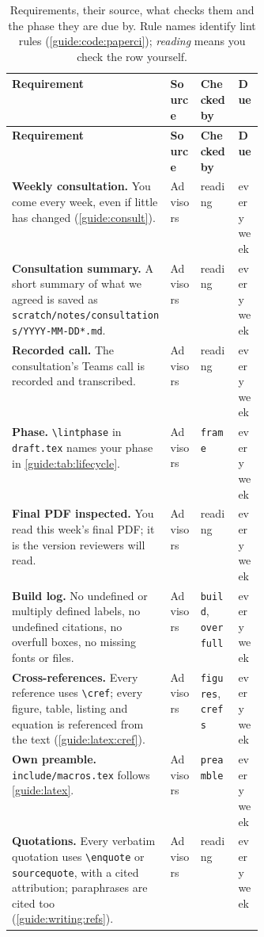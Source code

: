 {\small
\begin{xltabular}{\linewidth}{X >{\raggedright\arraybackslash}p{0.12\linewidth} >{\raggedright\arraybackslash}p{0.15\linewidth} >{\raggedright\arraybackslash}p{0.1\linewidth}}
  \caption{Requirements, their source, what checks them and the phase they are due by. Rule names identify lint rules (\cref{guide:code:paperci}); \emph{reading} means you check the row yourself.}\label{guide:tab:polish}\\
  \toprule \textbf{Requirement} & \textbf{Source} & \textbf{Checked by} & \textbf{Due} \\ \midrule \endfirsthead
  \toprule \textbf{Requirement} & \textbf{Source} & \textbf{Checked by} & \textbf{Due} \\ \midrule \endhead
  \bottomrule \endlastfoot
  \textbf{Weekly consultation.} You come every week, even if little has changed (\cref{guide:consult}). & Advisors & reading & every week \\
  \textbf{Consultation summary.} A short summary of what we agreed is saved as \texttt{scratch/notes/consultations/YYYY-MM-DD*.md}. & Advisors & reading & every week \\
  \textbf{Recorded call.} The consultation's Teams call is recorded and transcribed. & Advisors & reading & every week \\
  \textbf{Phase.} \texttt{\textbackslash lintphase} in \texttt{draft.tex} names your phase in \cref{guide:tab:lifecycle}. & Advisors & \texttt{frame} & every week \\
  \textbf{Final PDF inspected.} You read this week's final PDF; it is the version reviewers will read. & Advisors & reading & every week \\
  \textbf{Build log.} No undefined or multiply defined labels, no undefined citations, no overfull boxes, no missing fonts or files. & Advisors & \texttt{build}, \texttt{overfull} & every week \\
  \textbf{Cross-references.} Every reference uses \texttt{\textbackslash cref}; every figure, table, listing and equation is referenced from the text (\cref{guide:latex:cref}). & Advisors & \texttt{figures}, \texttt{crefs} & every week \\
  \textbf{Own preamble.} \texttt{include/macros.tex} follows \cref{guide:latex}. & Advisors & \texttt{preamble} & every week \\
  \textbf{Quotations.} Every verbatim quotation uses \texttt{\textbackslash enquote} or \texttt{sourcequote}, with a cited attribution; paraphrases are cited too (\cref{guide:writing:refs}). & Advisors & reading & every week \\

\end{xltabular}}
